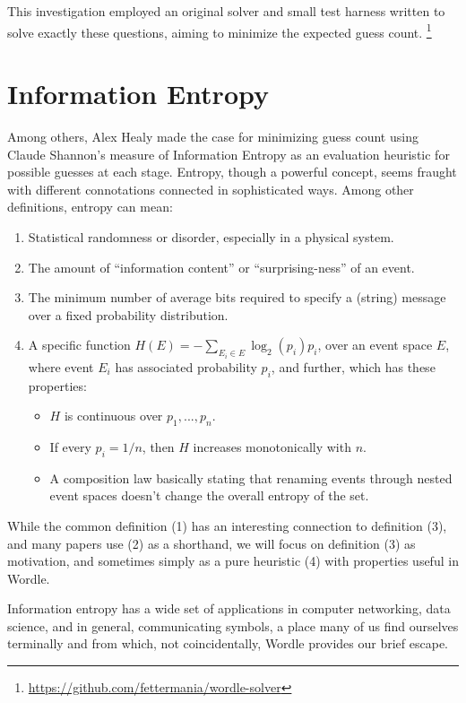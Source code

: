 \documentclass[11pt, oneside]{article} 	%
\begin{document}
This investigation employed an original solver and small test harness written to solve exactly these questions, aiming to minimize the expected guess count. \footnote{\url{https://github.com/fettermania/wordle-solver}}

\section{Information Entropy}

Among others, Alex Healy made the case \cite{1} for minimizing guess count using Claude Shannon's measure of Information Entropy \cite{2} as an evaluation heuristic for possible guesses at each stage. Entropy, though a powerful concept, seems fraught with different connotations connected in sophisticated ways. Among other definitions, entropy can mean:

\begin{enumerate}
\item Statistical randomness or disorder, especially in a physical system.
\item The amount of ``information content'' or ``surprising-ness'' of an event.
\item The minimum number of average bits required to specify a (string) message over a fixed probability distribution.
\item A specific function $H(E) = -\sum_{E_i \in E} \log_2(p_i)p_i$, over an event space $E$, where event $E_i$ has associated probability $p_i$, and further, which has these properties:
 \begin{itemize}
 \item $H$ is continuous over $p_1, ...,p_n$.
 \item If every $p_i = 1/n$, then $H$ increases monotonically with $n$.
 \item A composition law basically stating that renaming events through nested event spaces doesn't change the overall entropy of the set.
 \end{itemize}
\end{enumerate}

While the common definition (1) has an interesting connection to definition (3), and many papers use (2) as a shorthand, we will focus on definition (3) as motivation, and sometimes simply as a pure heuristic (4) with properties useful in Wordle.

Information entropy has a wide set of applications in computer networking, data science, and in general, communicating symbols, a place many of us find ourselves terminally and from which, not coincidentally, Wordle provides our brief escape.
\end{document}
